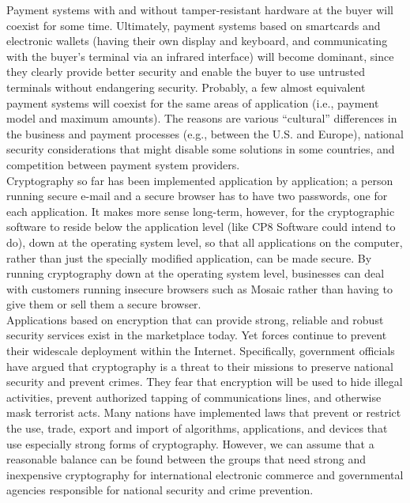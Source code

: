 Payment systems with and without tamper-resistant hardware at the buyer
will coexist for some time. Ultimately, payment systems based on
smartcards and electronic wallets (having their own display and
keyboard, and communicating with the buyer's terminal via an infrared
interface) will become dominant, since they clearly provide better
security and enable the buyer to use untrusted terminals without
endangering security. Probably, a few almost equivalent payment systems
will coexist for the same areas of application (i.e., payment model and
maximum amounts). The reasons are various ``cultural'' differences in
the business and payment processes (e.g., between the U.S. and Europe),
national security considerations that might disable some solutions in
some countries, and competition between payment system providers.\\

Cryptography so far has been implemented application by application; a
person running secure e-mail and a secure browser has to have two
passwords, one for each application. It makes more sense long-term,
however, for the cryptographic software to reside below the application
level (like CP8 Software could intend to do), down at the operating
system level, so that all applications on the computer, rather than
just the specially modified application, can be made secure. By running
cryptography down at the operating system level, businesses can deal
with customers running insecure browsers such as Mosaic rather than
having to give them or sell them a secure browser.\\

Applications based on encryption that can provide strong, reliable and
robust security services exist in the marketplace today. Yet forces
continue to prevent their widescale deployment within the Internet.
Specifically, government officials have argued that cryptography is a
threat to their missions to preserve national security and prevent
crimes. They fear that encryption will be used to hide illegal
activities, prevent authorized tapping of communications lines, and
otherwise mask terrorist acts. Many nations have implemented laws that
prevent or restrict the use, trade, export and import of algorithms,
applications, and devices that use especially strong forms of
cryptography. However, we can assume that a reasonable balance can be
found between the groups that need strong and inexpensive cryptography
for international electronic commerce and governmental agencies
responsible for national security and crime prevention.\\


